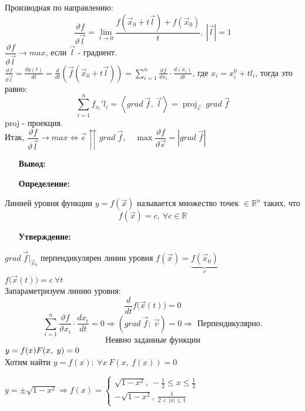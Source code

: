 \documentclass[12pt, letterpaper, twoside]{article}
\newcommand{\DS}{\displaystyle}
\newcommand{\Abs}[1]{\left| #1 \right|}
\newcommand{\mb}[1]{\mathbb{#1}}
\begin{document}
    Производная по направлению:
    \[\frac{\vartheta f}{\vartheta \vec{l}} = \lim_{t\to 0} \frac{f(\vec{x}_0 + t\vec{l}) + f(\vec{x}_0)}{t},\ \Abs{\vec{l}} = 1\]
    $\dfrac{\vartheta f}{\vartheta \vec{l}}\to max$, если $\vec{l}$ - градиент. \\
    $\DS\frac{\vartheta f}{\vartheta\vec{l}} = \frac{dg(t)}{dt} = \frac{d}{dt}\left( \vec{f} (\vec{x}_0 + t\vec{l})\right) = \sum_{i = 1}^{n} \frac{\vartheta f}{\vartheta x_i}\cdot \frac{d(x_i)}{dt}$, где $x_i = x_i^0 + tl_i$, тогда это равно:
    \[\sum_{i = 1}^{n} f_{x_i}'l_i = \left< grad\ \vec{f},\ \vec{l} \right> = \operatorname{proj}_{\vec{e}}\ grad\ \vec{f}\]
    proj - проекция.\\
    Итак, $\dfrac{\vartheta f}{\vartheta \vec{l}}\to max \Leftrightarrow \vec{e}\upuparrows grad\ \vec{f},\quad \max \dfrac{\vartheta f}{\vartheta \vec{e}} = \Abs{grad\ \vec{f}}$
    \begin{enumerate}
        \item[\textbf{Вывод:}]
    \end{enumerate}
    \begin{enumerate}
        \item[\textbf{Определение:}]
    \end{enumerate}
    Линией уровня функции $y = f(\vec{x})$ называется множество точек $\in \mb{R}^n$ таких, что
    \[f(\vec{x}) = c,\ \forall c\in \mb{R}\]
    \begin{enumerate}
        \item[\textbf{Утверждение:}]
    \end{enumerate}
    $grad\ \vec{f}\big|_{\vec{x}_0}$ перпендикулярен линии уровня $f(\vec{x}) = \underset{c}{\underbrace{f(\vec{x}_0)}}$\\
    $f\big(\vec{x}(t)\big) = c\ \forall t$\\
    Запараметризуем линию уровня:\\
    \[\frac{d}{dt} f\big(\vec{x}(t)\big) = 0\]
    \[\sum_{i = 1}^{n} \frac{\vartheta f}{\vartheta x_i}\cdot \frac{dx_i}{dt} = 0\Rightarrow (grad\ \vec{f};\ \vec{v}) = 0\Rightarrow \text{ Перпендикулярно.}\]
    \[\text{Неявно заданные функции}\]
    $y = f(x)\\
    F(x,\ y) = 0$\\
    Хотим найти $y = f(x):\ \forall x\  F(x,\ f(x)) = 0$
    \begin{enumerate}
        \item[\text{Пример:}]
    \end{enumerate}
    $y = \pm\sqrt{1 - x^2}\Rightarrow f(x) = \begin{cases}
        \sqrt{1 - x^2},\ -\frac{1}{2} \leq x \leq \frac{1}{2}\\
        -\sqrt{1 - x^2},\ \frac{1}{2 < |x| \leq 1}
    \end{cases}$
\end{document}
